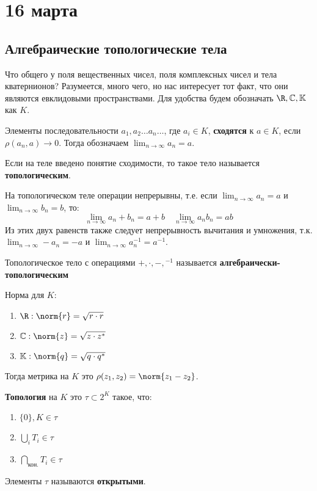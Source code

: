 \chapter{16 марта}

\section{Алгебраические топологические тела}

Что общего у поля вещественных чисел, поля комплексных чисел и тела кватернионов?
Разумеется, много чего, но нас интересует тот факт, что они являются евклидовыми пространствами.
Для удобства будем обозначать \(\R, \mathbb{C}, \mathbb{K}\) как \(K\).

\begin{definition}
	Элементы последовательности \(a_1, a_2 \ldots a_n \ldots\), где \(a_i \in K\),
	\textbf{сходятся} к \(a \in K\), если \(\rho(a_n, a) \to 0\).
	Тогда обозначаем \(\lim_{n\to \infty} a_n = a\).
\end{definition}

\begin{definition}
	Если на теле введено понятие сходимости, то такое тело называется \textbf{топологическим}.
\end{definition}

На топологическом теле операции непрерывны, т.е. если \(\lim_{n\to \infty} a_n = a\) и \(\lim_{n \to \infty} b_n = b\), то:
\[\lim_{n \to \infty} a_n + b_n = a + b \quad \lim_{n \to \infty} a_n b_n = a b\] 
Из этих двух равенств также следует непрерывность вычитания и умножения,
т.к. \(\lim_{n \to \infty} -a_n = -a\) и \(\lim_{n \to \infty} a_n^{-1} = a^{-1}\).

\begin{definition}
    Топологическое тело с операциями \(+, \cdot, -, {}^{-1}\) называется \textbf{алгебраически-топологическим}
\end{definition}

Норма для \(K\):
\begin{enumerate}
    \item \(\R: \norm{r} = \sqrt{r \cdot r}\)
    \item \(\mathbb{C}: \norm{z} = \sqrt{z\cdot z^*}\) 
    \item \(\mathbb{K}: \norm{q} = \sqrt{q \cdot q^*}\)
\end{enumerate}

Тогда метрика на \(K\) это \(\rho(z_1, z_2) = \norm{z_1 - z_2}\).

\begin{definition}
    \textbf{Топология} на \(K\) это \(\tau \subset 2^K\) такое, что:
    \begin{enumerate}
        \item \(\{0\}, K \in \tau\) 
        \item \(\bigcup_i T_i \in \tau\) 
        \item \(\bigcap_{\text{кон.}} T_i \in \tau\) 
    \end{enumerate}
    Элементы \(\tau\) называются \textbf{открытыми}.
\end{definition}

